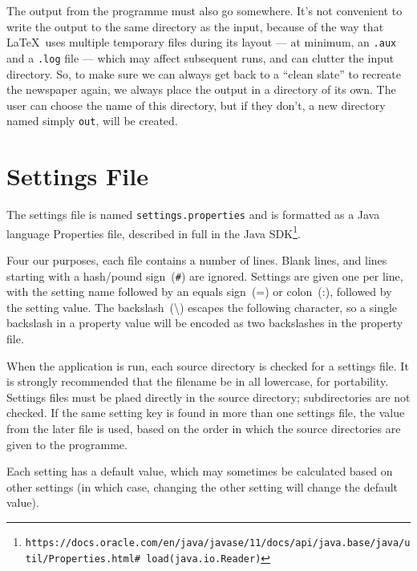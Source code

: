 \documentclass[a4paper,DIV=11]{scrartcl}
\begin{document}
The output from the programme must also go somewhere. It's not
convenient to write the output to the same directory as the input,
because of the way that \LaTeX\ uses multiple temporary files during
its layout --- at minimum, an \verb!.aux! and a \verb!.log! file ---
which may affect subsequent runs, and can clutter the input
directory. So, to make sure we can always get back to a ``clean
slate'' to recreate the newspaper again, we always place the output in
a directory of its own. The user can choose the name of this
directory, but if they don't, a new directory named simply \verb!out!,
will be created.


\section{Settings File}

The settings file is named \verb!settings.properties! and is formatted
as a Java language Properties file, described in full in the Java
SDK\footnote{\texttt{https://docs.oracle.com/en/java/javase/11/docs/api/java.base/java/util/Properties.html\#
    load(java.io.Reader)}}.

Four our purposes, each file contains a number of lines. Blank lines,
and lines starting with a hash/pound sign~(\verb!#!) are
ignored. Settings are given one per line, with the setting name
followed by an equals sign~(=) or colon~(:), followed by the setting
value. The backslash~(\textbackslash) escapes the following character,
so a single backslash in a property value will be encoded as two
backslashes in the property file.

When the application is run, each source directory is checked for a
settings file. It is strongly recommended
that the filename be in all lowercase, for portability. Settings files
must be plaed directly in the source directory; subdirectories are not
checked. If the same setting key is found in more than one settings
file, the value from the later file is used, based on the order in
which the source directories are given to the programme.

Each setting has a default value, which may sometimes be calculated based on
other settings (in which case, changing the other setting will change
the default value).
\end{document}
